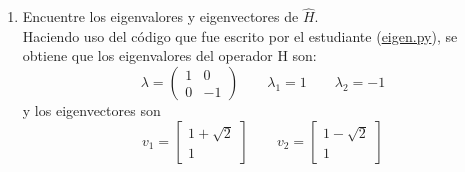 \documentclass[12pt,letterpaper]{report}
\begin{document}
\begin{enumerate}
\begin{align*}
\begin{matrix}
            1 & 0 \\
            0 & 1
        \end{matrix}\right)
    \end{align*}
    calculando $H^*H$:
    \begin{align*}
        H^*H&= \frac{1}{\sqrt{2}} \left(\begin{matrix}
            1 & 1 \\
            1 & -1
        \end{matrix}\right)\frac{1}{\sqrt{2}} \left(\begin{matrix}
            1 & 1 \\
            1 & -1
        \end{matrix}\right)  \\
        & =\frac{1}{2} \left(\begin{matrix}
            2 & 0 \\
            0 & 2
        \end{matrix}\right)\\
        & = \left(\begin{matrix}
            1 & 0 \\
            0 & 1
        \end{matrix}\right)
    \end{align*}
    como $H^*H=HH^*=I$, entonces H es unitaria.
    \item Encuentre los eigenvalores y eigenvectores de $\hat{H}$.\\
    Haciendo uso del código que fue escrito por el estudiante (\href{https://github.com/giovannilopez9808/Notas_Agosto_2020/blob/master/AMC/Tarea5/eigen.py}{eigen.py}), se obtiene que los eigenvalores del operador H son:
    \begin{equation*}
        \lambda = \left(\begin{matrix}
            1 & 0\\
            0 &-1
        \end{matrix}\right) \qquad \lambda_1 = 1 \qquad \lambda_2=-1
    \end{equation*}
    y los eigenvectores son
    \begin{equation*}
        v_1=\left[\begin{matrix}
                1+\sqrt{2} \\ 1 
        \end{matrix}\right] \qquad v_2=\left[\begin{matrix}
            1-\sqrt{2} \\ 1 
    \end{matrix}\right]
    \end{equation*}
\end{enumerate}
\end{document}
